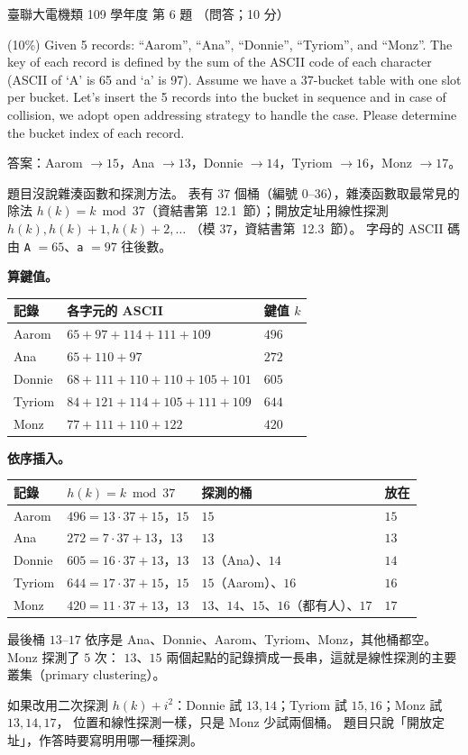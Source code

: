 \begin{pastexam}[label={px:ust-109-ee-ds-06}]{臺聯大電機類 109 學年度 第 6 題}
（問答；10 分）

(10\%) Given 5 records: ``Aarom'', ``Ana'', ``Donnie'', ``Tyriom'', and ``Monz''. The key of each
record is defined by the sum of the ASCII code of each character (ASCII of `A' is 65 and `a' is 97).
Assume we have a 37-bucket table with one slot per bucket. Let's insert the 5 records into the
bucket in sequence and in case of collision, we adopt open addressing strategy to handle the case.
Please determine the bucket index of each record.
\end{pastexam}

\begin{pastsoln}
答案：Aarom $\to 15$，Ana $\to 13$，Donnie $\to 14$，Tyriom $\to 16$，Monz $\to 17$。

題目沒說雜湊函數和探測方法。 表有 $37$ 個桶（編號 $0$--$36$），雜湊函數取最常見的除法
$h(k) = k \bmod 37$（資結書第~12.1~節）；開放定址用線性探測 $h(k), h(k)+1, h(k)+2, \ldots$
（模 $37$，資結書第~12.3~節）。 字母的 ASCII 碼由 \texttt{A} $= 65$、\texttt{a} $= 97$ 往後數。

\textbf{算鍵值。}
\begin{center}
\small
\begin{tabular}{lll}
\toprule
記錄 & 各字元的 ASCII & 鍵值 $k$ \\
\midrule
Aarom & $65 + 97 + 114 + 111 + 109$ & $496$ \\
Ana & $65 + 110 + 97$ & $272$ \\
Donnie & $68 + 111 + 110 + 110 + 105 + 101$ & $605$ \\
Tyriom & $84 + 121 + 114 + 105 + 111 + 109$ & $644$ \\
Monz & $77 + 111 + 110 + 122$ & $420$ \\
\bottomrule
\end{tabular}
\end{center}

\textbf{依序插入。}
\begin{center}
\small
\begin{tabular}{llll}
\toprule
記錄 & $h(k) = k \bmod 37$ & 探測的桶 & 放在 \\
\midrule
Aarom & $496 = 13 \cdot 37 + 15$，$15$ & $15$ & $15$ \\
Ana & $272 = 7 \cdot 37 + 13$，$13$ & $13$ & $13$ \\
Donnie & $605 = 16 \cdot 37 + 13$，$13$ & $13$（Ana）、$14$ & $14$ \\
Tyriom & $644 = 17 \cdot 37 + 15$，$15$ & $15$（Aarom）、$16$ & $16$ \\
Monz & $420 = 11 \cdot 37 + 13$，$13$ & $13$、$14$、$15$、$16$（都有人）、$17$ & $17$ \\
\bottomrule
\end{tabular}
\end{center}
最後桶 $13$--$17$ 依序是 Ana、Donnie、Aarom、Tyriom、Monz，其他桶都空。 Monz 探測了 $5$ 次：
$13$、$15$ 兩個起點的記錄擠成一長串，這就是線性探測的主要叢集（primary clustering）。

如果改用二次探測 $h(k) + i^2$：Donnie 試 $13, 14$；Tyriom 試 $15, 16$；Monz 試 $13, 14, 17$，
位置和線性探測一樣，只是 Monz 少試兩個桶。 題目只說「開放定址」，作答時要寫明用哪一種探測。
\end{pastsoln}
